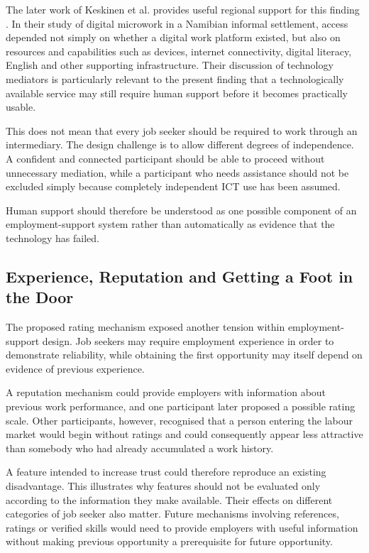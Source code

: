 The later work of Keskinen et al. provides useful regional support for this finding \cite{keskinen2022}. In their study of digital microwork in a Namibian informal settlement, access depended not simply on whether a digital work platform existed, but also on resources and capabilities such as devices, internet connectivity, digital literacy, English and other supporting infrastructure. Their discussion of technology mediators is particularly relevant to the present finding that a technologically available service may still require human support before it becomes practically usable.

This does not mean that every job seeker should be required to work through an intermediary. The design challenge is to allow different degrees of independence. A confident and connected participant should be able to proceed without unnecessary mediation, while a participant who needs assistance should not be excluded simply because completely independent ICT use has been assumed.

Human support should therefore be understood as one possible component of an employment-support system rather than automatically as evidence that the technology has failed.


\subsection{Experience, Reputation and Getting a Foot in the Door}

The proposed rating mechanism exposed another tension within employment-support design. Job seekers may require employment experience in order to demonstrate reliability, while obtaining the first opportunity may itself depend on evidence of previous experience.

A reputation mechanism could provide employers with information about previous work performance, and one participant later proposed a possible rating scale. Other participants, however, recognised that a person entering the labour market would begin without ratings and could consequently appear less attractive than somebody who had already accumulated a work history.

A feature intended to increase trust could therefore reproduce an existing disadvantage. This illustrates why features should not be evaluated only according to the information they make available. Their effects on different categories of job seeker also matter. Future mechanisms involving references, ratings or verified skills would need to provide employers with useful information without making previous opportunity a prerequisite for future opportunity.


